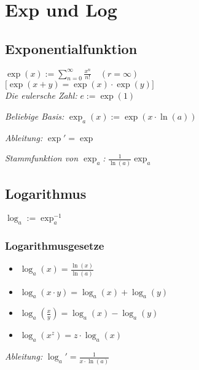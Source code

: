 \section*{Exp und Log}

\subsection*{Exponentialfunktion}
$\displaystyle \exp(x) := \sum_{n=0}^\infty\frac{x^n}{n!} \quad(r=\infty)$ \\
$\big[\exp(x+y)=\exp(x)\cdot\exp(y)\big]$ \\

\textit{Die eulersche Zahl:} $e:=\exp(1)$

\textit{Beliebige Basis:} $\exp_a(x) := \exp(x \cdot \ln(a))$

\textit{Ableitung:} $\exp' = \exp$

\textit{Stammfunktion von $\exp_a$:} $\frac{1}{\ln(a)}\exp_a$

\subsection*{Logarithmus}
$\log_a := \exp_a^{-1}$

\subsubsection*{Logarithmusgesetze}
\begin{itemize}
	\item $\log_a(x)=\frac{\ln(x)}{\ln(a)}$
	\item $\log_a(x\cdot y)=\log_a(x)+\log_a(y)$
	\item $\log_a(\frac{x}{y})=\log_a(x)-\log_a(y)$
	\item $\log_a(x^z)=z\cdot\log_a(x)$
\end{itemize}

\textit{Ableitung:} $\log_a'=\frac{1}{x\cdot\ln(a)}$

